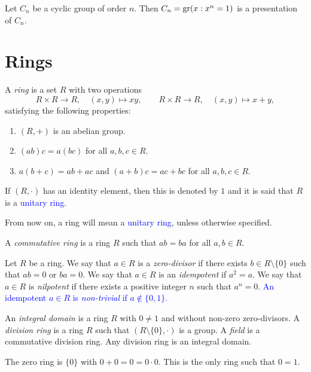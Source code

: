 \begin{example}
    Let $C_n$ be a cyclic group of order $n$. 
    Then $C_n=\operatorname{gr}(x: x^n=1)$ is a presentation of $C_n$.
\end{example}

\section{Rings}

A {\em ring} is a set $R$ with two operations
\[
R\times R\rightarrow R,
\quad
(x,y)\mapsto xy,
\qquad
R\times R\rightarrow R,
\quad
(x,y)\mapsto x+y,
\]
satisfying the following properties:
\begin{enumerate}
	\item $(R,+)$ is an abelian group.
	\item $(ab)c=a(bc)$ for all $a,b,c\in R$.
    \item $a(b+c)=ab+ac$ and $(a+b)c=ac+bc$ for all $a,b,c\in R$.
\end{enumerate}
If $(R,\cdot)$ has an identity element, then this is denoted by $1$ 
and it is said that $R$ is a \textcolor{blue}{unitary ring}. 

\begin{convention}
    From now on, a ring will mean a \textcolor{blue}{unitary ring}, unless otherwise specified. 
\end{convention}

A {\em commutative ring} is a ring $R$ such that
$ab=ba$ for all $a,b\in R$.

Let $R$ be a ring. We say that $a\in R$ is a {\em zero-divisor} if there exists $b\in R\setminus\{0\}$ 
such that $ab=0$ or $ba=0$. We say that $a\in R$ is an {\em idempotent} if $a^2=a$. 
We say that $a\in R$ is {\em nilpotent} if there exists a positive integer $n$ such that $a^n=0$.  
\textcolor{blue}{An idempotent $a\in R$ is {\em non-trivial} if $a\not\in\{0,1\}$.}

An {\em integral domain} is a ring $R$ with $0\neq 1$ and without non-zero zero-divisors.
A {\em division ring} is a ring $R$ such that $(R\setminus \{0\},\cdot)$ is a group. 
A {\em field} is a commutative division ring. Any division ring is an integral domain.

\begin{example} 
    The zero ring is $\{0\}$ with $0+0=0=0\cdot 0$. This is the only ring such that $0=1$.
\end{example}

